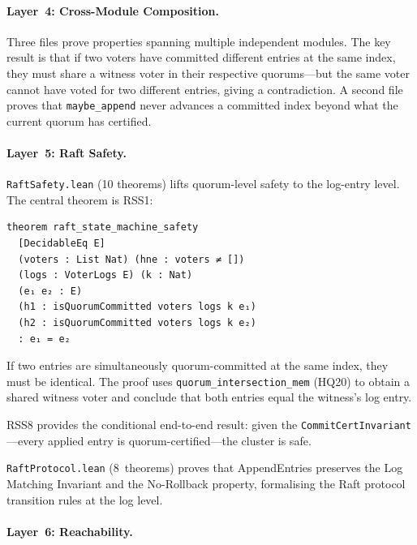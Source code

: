\documentclass[sigconf,10pt]{acmart}
\begin{document}
\paragraph{Layer~4: Cross-Module Composition.}
Three files prove properties spanning multiple independent modules.
The key result is that if two voters
have committed different entries at the same index, they must share a
witness voter in their respective quorums---but the same voter cannot
have voted for two different entries, giving a contradiction.
A second file proves that
\texttt{maybe\_append} never advances a committed index beyond what
the current quorum has certified.

\paragraph{Layer~5: Raft Safety.}
\texttt{RaftSafety.lean} (10 theorems) lifts quorum-level safety to
the log-entry level.  The central theorem is RSS1:

\begin{lstlisting}[language=Lean4]
theorem raft_state_machine_safety
  [DecidableEq E]
  (voters : List Nat) (hne : voters ≠ [])
  (logs : VoterLogs E) (k : Nat)
  (e₁ e₂ : E)
  (h1 : isQuorumCommitted voters logs k e₁)
  (h2 : isQuorumCommitted voters logs k e₂)
  : e₁ = e₂
\end{lstlisting}

If two entries are simultaneously quorum-committed at the same index,
they must be identical.  The proof uses \texttt{quorum\_intersection\_mem}
(HQ20) to obtain a shared witness voter and conclude that both entries
equal the witness's log entry.

RSS8 provides the
conditional end-to-end result: given the
\texttt{CommitCertInvariant}---every applied
entry is quorum-certified---the cluster is safe.

\texttt{RaftProtocol.lean} (8~theorems) proves that
AppendEntries preserves the Log Matching Invariant and
the No-Rollback property, formalising the Raft protocol transition
rules at the log level.

\paragraph{Layer~6: Reachability.}
\end{document}
